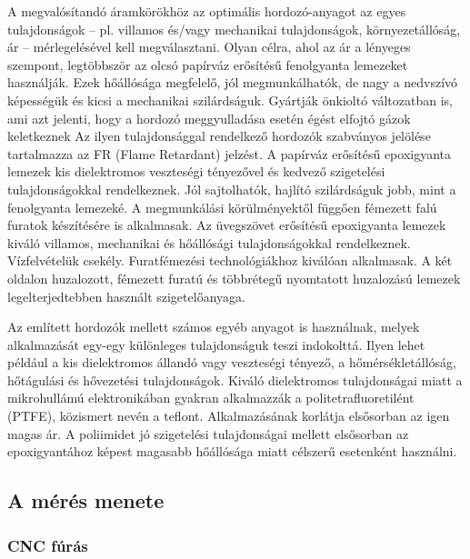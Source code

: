\documentclass[../labor.tex]{subfiles}
\begin{document}
    A megvalósítandó áramkörökhöz az optimális hordozó-anyagot az egyes tulajdonságok – pl. villamos és/vagy mechanikai tulajdonságok, környezetállóság, ár – mérlegelésével kell megválasztani. Olyan célra, ahol az ár a lényeges szempont, legtöbbször az olcsó papírváz erősítésű fenolgyanta lemezeket használják. Ezek hőállósága megfelelő, jól megmunkálhatók, de nagy a nedvszívó képességük és kicsi a mechanikai szilárdságuk. Gyártják önkioltó változatban is, ami azt jelenti, hogy a hordozó meggyulladása esetén égést elfojtó gázok keletkeznek Az ilyen tulajdonsággal rendelkező hordozók szabványos jelölése tartalmazza az FR (Flame Retardant) jelzést. A papírváz erősítésű epoxigyanta lemezek kis dielektromos veszteségi tényezővel és kedvező szigetelési tulajdonságokkal rendelkeznek. Jól sajtolhatók, hajlító szilárdságuk jobb, mint a fenolgyanta lemezeké. A megmunkálási körülményektől függően fémezett falú furatok készítésére is alkalmasak. Az üvegszövet erősítésű epoxigyanta lemezek kiváló villamos, mechanikai és hőállósági tulajdonságokkal rendelkeznek. Vízfelvételük csekély. Furatfémezési technológiákhoz kiválóan alkalmasak. A két oldalon huzalozott, fémezett furatú és többrétegű nyomtatott huzalozású lemezek legelterjedtebben használt szigetelőanyaga.
    
    Az említett hordozók mellett számos egyéb anyagot is használnak, melyek alkalmazását egy-egy különleges tulajdonságuk teszi indokolttá. Ilyen lehet például a kis dielektromos állandó vagy veszteségi tényező, a hőmérsékletállóság, hőtágulási és hővezetési tulajdonságok. Kiváló dielektromos tulajdonságai miatt a mikrohullámú elektronikában gyakran alkalmazzák a politetrafluoretilént (PTFE), közismert nevén a teflont. Alkalmazásának korlátja elsősorban az igen magas ár. A poliimidet jó szigetelési tulajdonságai mellett elsősorban az epoxigyantához képest magasabb hőállósága miatt célszerű esetenként használni.

    \subsection{A mérés menete}

    \subsubsection{CNC fúrás}
\end{document}
